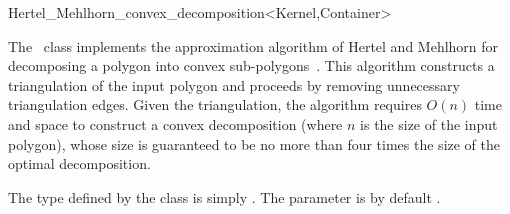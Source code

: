 
\ccRefPageBegin

\begin{ccRefClass}{Hertel_Mehlhorn_convex_decomposition<Kernel,Container>}
\label{mink_ref:HM_decomp}


\ccDefinition

The \ccRefName\ class implements the approximation algorithm of Hertel
and Mehlhorn for decomposing a polygon into convex 
sub-polygons~\cite{hm-ftsp-83}. This algorithm constructs a
triangulation of the input polygon and proceeds by removing
unnecessary triangulation edges. Given the triangulation, the
algorithm requires $O(n)$ time and space to construct a convex
decomposition (where $n$ is the size of the input polygon), whose
size is guaranteed to be no more than four times the size of the
optimal decomposition.

The  type defined by the class is simply
. The  parameter
is by default .


\ccIsModel

\end{ccRefClass}

\ccRefPageEnd
